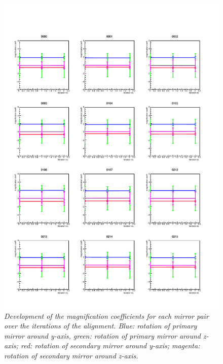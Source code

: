 \begin{figure}[!ht]
	\vspace*{-0.cm}
	\begin{center}
		\includegraphics[width=1.\textwidth]{rich1_mag1_2.pdf}
		\vspace*{-1.5cm}
	\end{center}
	\caption{\textit{Development of the magnification coefficients for each mirror pair over the iterations of the alignment. Blue: rotation of primary mirror around y-axis, green: rotation of primary mirror around z-axis; red: rotation of secondary mirror around y-axis; magenta: rotation of secondary mirror around z-axis.}}
	\label{fig:rich1mag1_2}
\end{figure}

